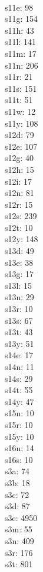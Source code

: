 \begin{multicols}{8}
  \\ s11e: 98
  \\ s11g: 154
  \\ s11h: 43
  \\ s11l: 141
  \\ s11m: 17
  \\ s11n: 206
  \\ s11r: 21
  \\ s11s: 151
  \\ s11t: 51
  \\ s11w: 12
  \\ s11y: 108
  \\ s12d: 79
  \\ s12e: 107
  \\ s12g: 40
  \\ s12h: 15
  \\ s12i: 17
  \\ s12n: 81
  \\ s12r: 15
  \\ s12s: 239
  \\ s12t: 10
  \\ s12y: 148
  \\ s13d: 49
  \\ s13e: 38
  \\ s13g: 17
  \\ s13l: 15
  \\ s13n: 29
  \\ s13r: 10
  \\ s13s: 67
  \\ s13t: 43
  \\ s13y: 51
  \\ s14e: 17
  \\ s14n: 11
  \\ s14s: 29
  \\ s14t: 55
  \\ s14y: 47
  \\ s15n: 10
  \\ s15r: 10
  \\ s15y: 10
  \\ s16n: 14
  \\ s16s: 10
  \\ s3a: 74
  \\ s3b: 18
  \\ s3c: 72
  \\ s3d: 87
  \\ s3e: 4950
  \\ s3m: 55
  \\ s3n: 409
  \\ s3r: 176
  \\ s3t: 801

\end{multicols}
